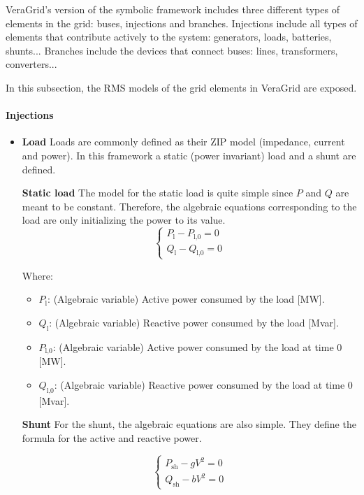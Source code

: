 VeraGrid's version of the symbolic framework includes three different types of elements in the grid: buses, injections and branches. Injections include all types of elements
that contribute actively to the system: generators, loads, batteries, shunts... Branches include the devices that connect buses: lines, transformers, converters... 

In this subsection, the RMS models of the grid elements in VeraGrid are exposed.

\paragraph{Injections}


\begin{itemize}
\item \textbf{Load}
Loads are commonly defined as their ZIP model (impedance, current and power). In this framework a static (power invariant) load and a shunt are defined.

\textbf{Static load}
The model for the static load is quite simple since $P$ and $Q$ are meant to be constant. Therefore, the algebraic equations
corresponding to the load are only initializing the power to its value.
\begin{equation}
\begin{cases}
P_\text{l} -P_{\text{l,0}} = 0\\
Q_\text{l} -Q_{\text{l,0}} = 0
\end{cases}
\label{eq:alg_eq_load}
\end{equation}

Where:
\begin{itemize}
  \item $P_\text{l}$: (Algebraic variable) Active power consumed by the load [MW].
  \item $Q_\text{l}$: (Algebraic variable) Reactive power consumed by the load [Mvar].
  \item $P_{\text{l,0}}$: (Algebraic variable) Active power consumed by the load at time 0 [MW].
  \item $Q_{\text{l,0}}$: (Algebraic variable) Reactive power consumed by the load at time 0 [Mvar].
\end{itemize}

\textbf{Shunt}
For the shunt, the algebraic equations are also simple. They define the formula for the active and reactive power.

\begin{equation}
\begin{cases}
P_{\text{sh}} - g V^2 = 0 \\
Q_{\text{sh}} - b V^2 = 0
\end{cases}
\label{eq:alg_eq_shunt}
\end{equation}


\end{itemize}
